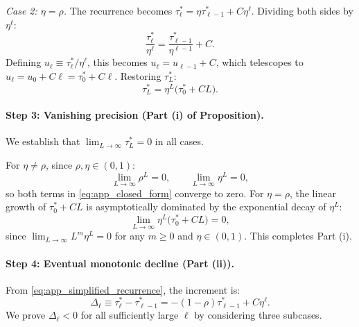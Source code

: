 \textit{Case 2: $\eta = \rho$.} The recurrence becomes $\tau^{*}_{\ell} = \eta \tau^{*}_{\ell-1} + C\eta^{\ell}$. Dividing both sides by $\eta^{\ell}$:
\begin{equation}
\frac{\tau^{*}_{\ell}}{\eta^{\ell}} = \frac{\tau^{*}_{\ell-1}}{\eta^{\ell-1}} + C.
\end{equation}
Defining $u_{\ell} \equiv \tau^{*}_{\ell}/\eta^{\ell}$, this becomes $u_{\ell} = u_{\ell-1} + C$, which telescopes to $u_{\ell} = u_{0} + C\ell = \tau^{*}_{0} + C\ell$. Restoring $\tau^{*}_{L}$:
\begin{equation}\label{eq:app_equal_case}
\tau^{*}_{L} = \eta^{L}\bigl(\tau^{*}_{0} + CL\bigr).
\end{equation}

\paragraph{Step 3: Vanishing precision (Part (i) of Proposition).}
We establish that $\lim_{L\to\infty} \tau^{*}_{L} = 0$ in all cases.

For $\eta \neq \rho$, since $\rho, \eta \in (0,1)$:
\begin{equation}
\lim_{L\to\infty} \rho^{L} = 0, \qquad \lim_{L\to\infty} \eta^{L} = 0,
\end{equation}
so both terms in \eqref{eq:app_closed_form} converge to zero. For $\eta = \rho$, the linear growth of $\tau^{*}_{0} + CL$ is asymptotically dominated by the exponential decay of $\eta^{L}$:
\begin{equation}
\lim_{L\to\infty} \eta^{L}\bigl(\tau^{*}_{0} + CL\bigr) = 0,
\end{equation}
since $\lim_{L\to\infty} L^{m} \eta^{L} = 0$ for any $m \geq 0$ and $\eta \in (0,1)$. This completes Part (i).

\paragraph{Step 4: Eventual monotonic decline (Part (ii)).}
From \eqref{eq:app_simplified_recurrence}, the increment is:
\begin{equation}\label{eq:app_delta}
\Delta_{\ell} \equiv \tau^{*}_{\ell} - \tau^{*}_{\ell-1} = -(1-\rho)\tau^{*}_{\ell-1} + C\eta^{\ell}.
\end{equation}
We prove $\Delta_{\ell} < 0$ for all sufficiently large $\ell$ by considering three subcases.

